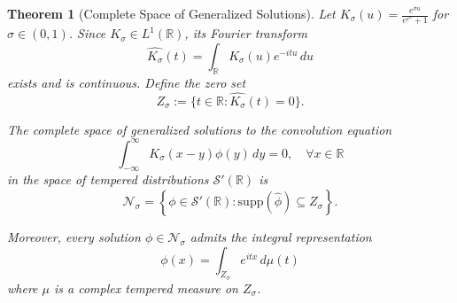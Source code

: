 \documentclass[11pt]{article}
\newtheorem{theorem}{Theorem}
\begin{document}
\begin{theorem}[Complete Space of Generalized Solutions]
\label{thm:generalized_solutions}
Let $K_\sigma(u) = \frac{e^{\sigma u}}{e^{e^u} + 1}$ for $\sigma \in (0,1)$. Since $K_\sigma \in L^1(\mathbb{R})$, its Fourier transform
\begin{equation}
\widehat{K_\sigma}(t) = \int_{\mathbb{R}} K_\sigma(u) e^{-itu} \, du
\end{equation}
exists and is continuous. Define the zero set
\begin{equation}
Z_\sigma := \{t \in \mathbb{R} : \widehat{K_\sigma}(t) = 0\}.
\end{equation}

The complete space of generalized solutions to the convolution equation
\begin{equation}
\int_{-\infty}^{\infty} K_\sigma(x-y) \phi(y) \, dy = 0, \quad \forall x \in \mathbb{R}
\end{equation}
in the space of tempered distributions $\mathcal{S}'(\mathbb{R})$ is
\begin{equation}
\mathcal{N}_\sigma = \left\{ \phi \in \mathcal{S}'(\mathbb{R}) : \text{supp}(\widehat{\phi}) \subseteq Z_\sigma \right\}.
\end{equation}

Moreover, every solution $\phi \in \mathcal{N}_\sigma$ admits the integral representation
\begin{equation}
\phi(x) = \int_{Z_\sigma} e^{itx} \, d\mu(t)
\end{equation}
where $\mu$ is a complex tempered measure on $Z_\sigma$.
\end{theorem}
\end{document}

